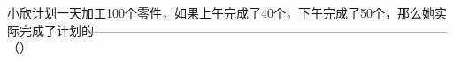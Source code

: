 
小欣计划一天加工100个零件，如果上午完成了40个，下午完成了50个，那么她实际完成了计划的--------------------------------------------------------------------------------------（\hspace{4em}）

